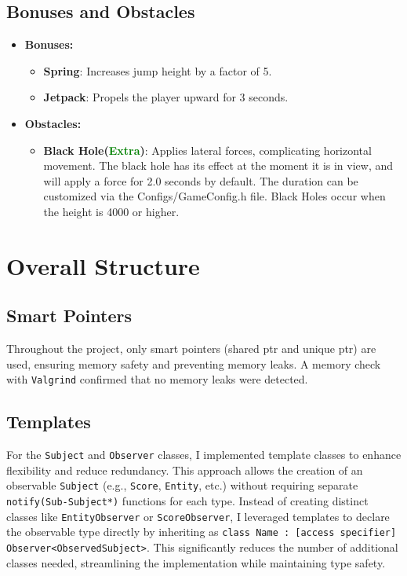 \documentclass{article}
\begin{document}
\subsection*{Bonuses and Obstacles}
\begin{itemize}
    \item \textbf{Bonuses:}
    \begin{itemize}
        \item \textbf{Spring}: Increases jump height by a factor of 5.
        \item \textbf{Jetpack}: Propels the player upward for 3 seconds.
    \end{itemize}
    \item \textbf{Obstacles:}
    \begin{itemize}
        \item \textbf{Black Hole(\textcolor{green}{Extra})}: Applies lateral forces, complicating horizontal movement. The black hole has its effect at the moment it is in view, and will apply a force for 2.0 seconds by default. The duration can be customized via the Configs/GameConfig.h file. Black Holes occur when the height is 4000 or higher.
    \end{itemize}
\end{itemize}

\section*{Overall Structure}

\subsection*{Smart Pointers}
Throughout the project, only smart pointers (shared ptr and unique ptr) are used, ensuring memory safety and preventing memory leaks. A memory check with \texttt{Valgrind} confirmed that no memory leaks were detected. 

\subsection*{Templates}
For the \texttt{Subject} and \texttt{Observer} classes, I implemented template classes to enhance flexibility and reduce redundancy. This approach allows the creation of an observable \texttt{Subject} (e.g., \texttt{Score}, \texttt{Entity}, etc.) without requiring separate \texttt{notify(Sub-Subject*)} functions for each type. Instead of creating distinct classes like \texttt{EntityObserver} or \texttt{ScoreObserver}, I leveraged templates to declare the observable type directly by inheriting as \texttt{class Name : [access specifier] Observer<ObservedSubject>}. This significantly reduces the number of additional classes needed, streamlining the implementation while maintaining type safety.
\end{document}
